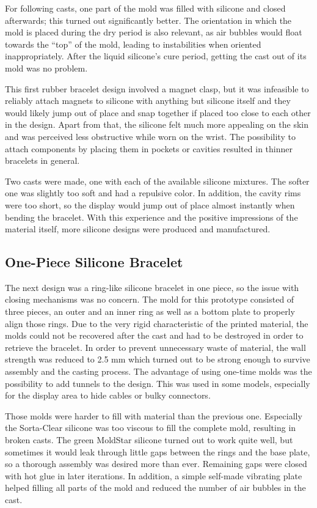 For following casts, one part of the mold was filled with silicone and closed afterwards; this turned out significantly better. The orientation in which the mold is placed during the dry period is also relevant, as air bubbles would float towards the ``top'' of the mold, leading to instabilities when oriented inappropriately. After the liquid silicone's cure period, getting the cast out of its mold was no problem.

This first rubber bracelet design involved a magnet clasp, but it was infeasible to reliably attach magnets to silicone with anything but silicone itself and they would likely jump out of place and snap together if placed too close to each other in the design. Apart from that, the silicone felt much more appealing on the skin and was perceived less obstructive while worn on the wrist. The possibility to attach components by placing them in pockets or cavities resulted in thinner bracelets in general.

Two casts were made, one with each of the available silicone mixtures. The softer one was slightly too soft and had a repulsive color. In addition, the cavity rims were too short, so the display would jump out of place almost instantly when bending the bracelet. With this experience and the positive impressions of the material itself, more silicone designs were produced and manufactured.

\subsection{One-Piece Silicone Bracelet}
The next design was a ring-like silicone bracelet in one piece, so the issue with closing mechanisms was no concern. The mold for this prototype consisted of three pieces, an outer and an inner ring as well as a bottom plate to properly align those rings. Due to the very rigid characteristic of the printed material, the molds could not be recovered after the cast and had to be destroyed in order to retrieve the bracelet. In order to prevent unnecessary waste of material, the wall strength was reduced to 2.5 mm which turned out to be strong enough to survive assembly and the casting process. The advantage of using one-time molds was the possibility to add tunnels to the design. This was used in some models, especially for the display area to hide cables or bulky connectors.

Those molds were harder to fill with material than the previous one. Especially the Sorta-Clear silicone was too viscous to fill the complete mold, resulting in broken casts. The green MoldStar silicone turned out to work quite well, but sometimes it would leak through little gaps between the rings and the base plate, so a thorough assembly was desired more than ever. Remaining gaps were closed with hot glue in later iterations. In addition, a simple self-made vibrating plate helped filling all parts of the mold and reduced the number of air bubbles in the cast. 

